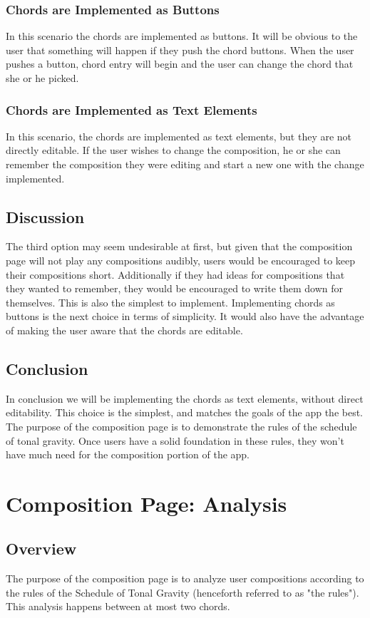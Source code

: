 \documentclass[onecolumn, draftclsnofoot,10pt, compsoc]{IEEEtran}
\begin{document}
\subsubsection{Chords are Implemented as Buttons}
In this scenario the chords are implemented as buttons. It will be obvious to the user that something will happen if they push the chord buttons. When the user pushes a button, chord entry will begin and the user can change the chord that she or he picked. 
\subsubsection{Chords are Implemented as Text Elements}
In this scenario, the chords are implemented as text elements, but they are not directly editable. If the user wishes to change the composition, he or she can remember the composition they were editing and start a new one with the change implemented. 
\subsection{Discussion}
The third option may seem undesirable at first, but given that the composition page will not play any compositions audibly, users would be encouraged to keep their compositions short. Additionally if they had ideas for compositions that they wanted to remember, they would be encouraged to write them down for themselves. This is also the simplest to implement. 
Implementing chords as buttons is the next choice in terms of simplicity. It would also have the advantage of making the user aware that the chords are editable. 
\subsection{Conclusion}
In conclusion we will be implementing the chords as text elements, without direct editability. This choice is the simplest, and matches the goals of the app the best. The purpose of the composition page is to demonstrate the rules of the schedule of tonal gravity. Once users have a solid foundation in these rules, they won't have much need for the composition portion of the app. 
 
\section{Composition Page: Analysis}
\subsection{Overview}
The purpose of the composition page is to analyze user compositions according to the rules of the Schedule of Tonal Gravity (henceforth referred to as "the rules"). This analysis happens between at most two chords. 
\end{document}
